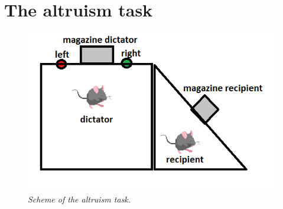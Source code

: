 \documentclass[11pt,a4paper,twocolumn]{article}
\begin{document}
\section{The altruism task}

\begin{figure}[H]
	\begin{center}
		\includegraphics[scale=0.4]{altruism.png} 
	\end{center} 
	\caption{\textit{Scheme of the altruism task.}} \label{altruism}
	
\end{figure}
\end{document}
